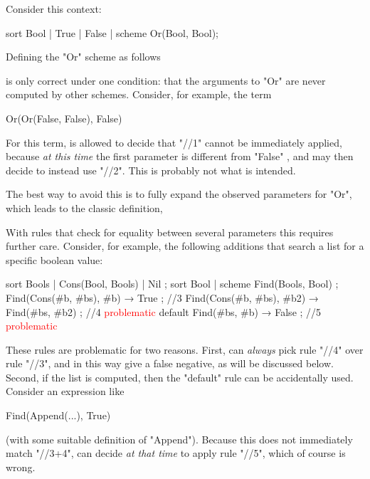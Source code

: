 \documentclass[11pt]{article} %
\begin{document}
Consider this context:
\begin{hacs}[xleftmargin=\parindent]
sort Bool | True | False | scheme Or(Bool, Bool);
\end{hacs}
Defining the "Or" scheme as follows
is only correct under one condition: that the arguments to "Or" are never computed by other
schemes. Consider, for example, the term
\begin{hacs}[xleftmargin=\parindent]
Or(Or(False, False), False)
\end{hacs}
For this term, \HAX is allowed to decide that "//1" cannot be immediately applied, because \emph{at
  this time} the first parameter is different from "False" , and \HAX may then decide to instead use
"//2". This is probably not what is intended.

The best way to avoid this is to fully expand the observed parameters for "Or", which leads to the
classic definition,
With rules that check for equality between several parameters this requires further care. Consider,
for example, the following additions that search a list for a specific boolean value:
\begin{hacs}[texcl,xleftmargin=\parindent]
sort Bools | Cons(Bool, Bools) | Nil ;
sort Bool | scheme Find(Bools, Bool) ;
Find(Cons(#b, #bs), #b) → True ;                      //3
Find(Cons(#b, #bs), #b2) → Find(#bs, #b2) ;         //4 \textcolor{red}{problematic}
default Find(#bs, #b) → False ;                         //5 \textcolor{red}{problematic}
\end{hacs}
These rules are problematic for two reasons. First, \HAX can \emph{always} pick rule "//4" over rule
"//3", and in this way give a false negative, as will be discussed below. Second, if the list is
computed, then the "default" rule can be accidentally used. Consider an expression like
\begin{hacs}[xleftmargin=\parindent]
Find(Append(...), True)
\end{hacs}
(with some suitable definition of "Append"). Because this does not immediately match "//3+4", \HAX
can decide \emph{at that time} to apply rule "//5", which of course is wrong.
\end{document}
